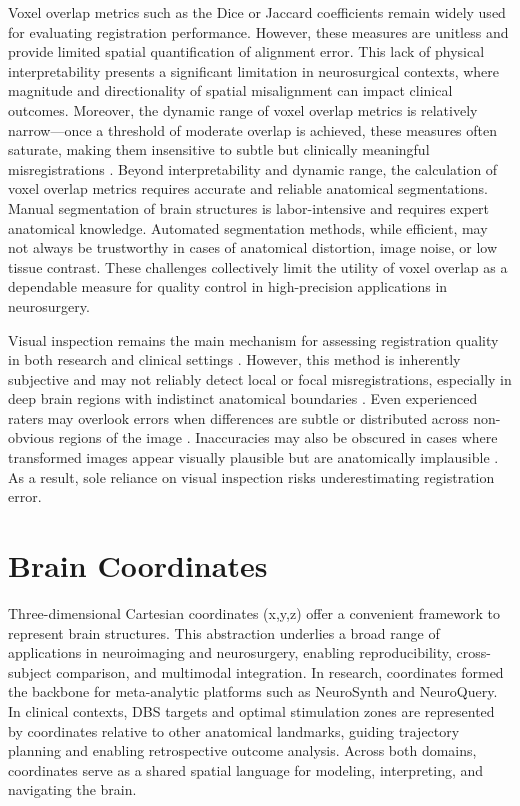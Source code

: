Voxel overlap metrics such as the Dice or Jaccard coefficients remain widely used for evaluating registration performance. However, these measures are unitless and provide limited spatial quantification of alignment error. This lack of physical interpretability presents a significant limitation in neurosurgical contexts, where magnitude and directionality of spatial misalignment can impact clinical outcomes. Moreover, the dynamic range of voxel overlap metrics is relatively narrow—once a threshold of moderate overlap is achieved, these measures often saturate, making them insensitive to subtle but clinically meaningful misregistrations \cite{Lau2019-eh}. Beyond interpretability and dynamic range, the calculation of voxel overlap metrics requires accurate and reliable anatomical segmentations. Manual segmentation of brain structures is labor-intensive and requires expert anatomical knowledge. Automated segmentation methods, while efficient, may not always be trustworthy in cases of anatomical distortion, image noise, or low tissue contrast. These challenges collectively limit the utility of voxel overlap as a dependable measure for quality control in high-precision applications in neurosurgery.

Visual inspection remains the main mechanism for assessing registration quality in both research and clinical settings \cite{Neudorfer2023-wd,Esteban2019-oz}. However, this method is inherently subjective and may not reliably detect local or focal misregistrations, especially in deep brain regions with indistinct anatomical boundaries \cite{Bosma2024-cf,Rohlfing2012-kt}. Even experienced raters may overlook errors when differences are subtle or distributed across non-obvious regions of the image \cite{de-Senneville2020-am}. Inaccuracies may also be obscured in cases where transformed images appear visually plausible but are anatomically implausible \cite{Rohlfing2012-kt}. As a result, sole reliance on visual inspection risks underestimating registration error.

\section{Brain Coordinates} 
Three-dimensional Cartesian coordinates (x,y,z) offer a convenient framework to represent brain structures. This abstraction underlies a broad range of applications in neuroimaging and neurosurgery, enabling reproducibility, cross-subject comparison, and multimodal integration. In research, coordinates formed the backbone for meta-analytic platforms such as NeuroSynth and NeuroQuery. In clinical contexts, DBS targets and optimal stimulation zones are represented by coordinates relative to other anatomical landmarks, guiding trajectory planning and enabling retrospective outcome analysis. Across both domains, coordinates serve as a shared spatial language for modeling, interpreting, and navigating the brain.

